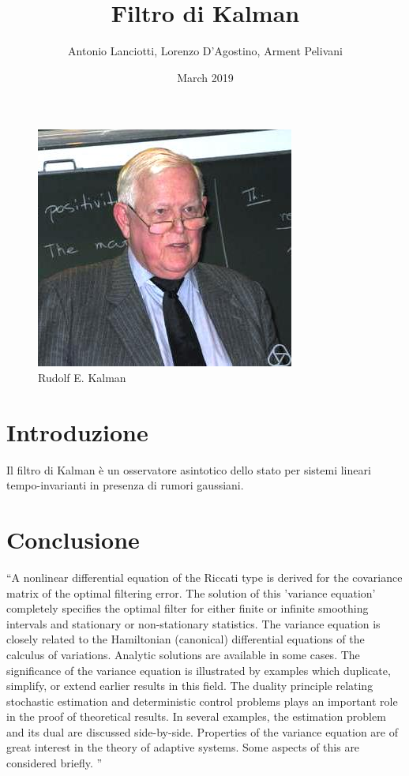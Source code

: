 \documentclass{article}
\title{Filtro di Kalman}
\author{Antonio Lanciotti, Lorenzo D'Agostino, Arment Pelivani}
\date{March 2019}
\begin{document}
\maketitle

\begin{figure}[ht]
\centering
\includegraphics[scale=1]{Rudolf_Kalman.jpg}
\caption{Rudolf E. Kalman}
\label{fig:kalman}
\end{figure}

\section{Introduzione}
Il filtro di Kalman è un osservatore asintotico dello stato per sistemi lineari tempo-invarianti in presenza di rumori gaussiani.

\newpage

\section{Conclusione}
``A nonlinear differential equation of the Riccati type is derived for the covariance matrix of the optimal filtering error. The solution of this 'variance equation' completely specifies the optimal filter for either finite or infinite smoothing intervals and stationary or non-stationary statistics.
The variance equation is closely related to the Hamiltonian (canonical) differential equations of the calculus of variations. Analytic solutions are available in some cases. The significance of the variance equation is illustrated by examples which duplicate, simplify, or extend earlier results in this field.
The duality principle relating stochastic estimation and deterministic control problems plays an important role in the proof of theoretical results. In several examples, the estimation problem and its dual are discussed side-by-side.
Properties of the variance equation are of great interest in the theory of adaptive systems. Some aspects of this are considered briefly. '' \citep{kalmanbucy}



\end{document}
